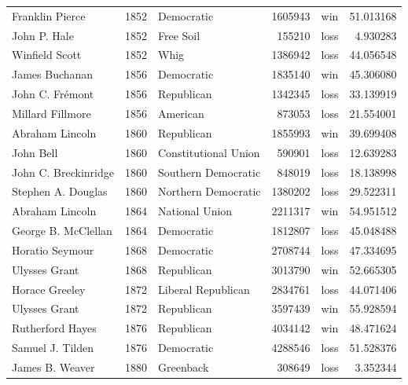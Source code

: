 \documentclass[
  letterpaper,
  DIV=11,
  numbers=noendperiod]{scrreprt}
\begin{document}
\begin{tabular}{lrlrlr}
Franklin Pierce        &  1852 &             Democratic &       1605943 &    win &  51.013168 \\
John P. Hale           &  1852 &              Free Soil &        155210 &   loss &   4.930283 \\
Winfield Scott         &  1852 &                   Whig &       1386942 &   loss &  44.056548 \\
James Buchanan         &  1856 &             Democratic &       1835140 &    win &  45.306080 \\
John C. Frémont        &  1856 &             Republican &       1342345 &   loss &  33.139919 \\
Millard Fillmore       &  1856 &               American &        873053 &   loss &  21.554001 \\
Abraham Lincoln        &  1860 &             Republican &       1855993 &    win &  39.699408 \\
John Bell              &  1860 &   Constitutional Union &        590901 &   loss &  12.639283 \\
John C. Breckinridge   &  1860 &    Southern Democratic &        848019 &   loss &  18.138998 \\
Stephen A. Douglas     &  1860 &    Northern Democratic &       1380202 &   loss &  29.522311 \\
Abraham Lincoln        &  1864 &         National Union &       2211317 &    win &  54.951512 \\
George B. McClellan    &  1864 &             Democratic &       1812807 &   loss &  45.048488 \\
Horatio Seymour        &  1868 &             Democratic &       2708744 &   loss &  47.334695 \\
Ulysses Grant          &  1868 &             Republican &       3013790 &    win &  52.665305 \\
Horace Greeley         &  1872 &     Liberal Republican &       2834761 &   loss &  44.071406 \\
Ulysses Grant          &  1872 &             Republican &       3597439 &    win &  55.928594 \\
Rutherford Hayes       &  1876 &             Republican &       4034142 &    win &  48.471624 \\
Samuel J. Tilden       &  1876 &             Democratic &       4288546 &   loss &  51.528376 \\
James B. Weaver        &  1880 &              Greenback &        308649 &   loss &   3.352344 \\

\end{tabular}
\end{document}
